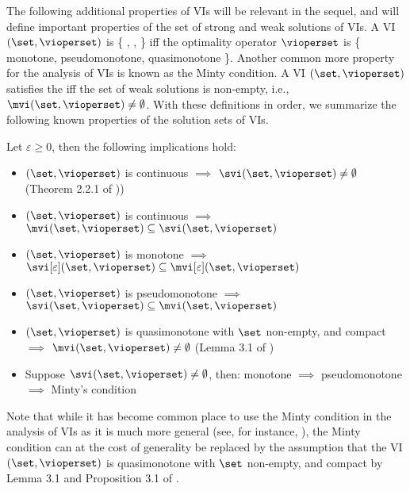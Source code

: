 The following additional properties of VIs will be relevant in the sequel, and will define important properties of the set of strong and weak solutions of VIs. 
A VI $(\set, \vioperset)$ is \{ , ,  \} iff the optimality operator $\vioperset$ is \{ monotone, pseudomonotone, quasimonotone \}.
% 
Another common more property for the analysis of VIs is known as the Minty condition. A VI $(\set, \vioperset)$ satisfies the  iff the set of weak solutions is non-empty, i.e., $\mvi(\set, \vioperset) \neq \emptyset$.
% 
With these definitions in order, we summarize the following known properties of the solution sets of VIs.

\begin{remark}
Let $\varepsilon \geq 0$, then the following implications hold:

    \begin{itemize}
        \item $(\set, \vioperset)$ is continuous $\implies$ $\svi(\set, \vioperset) \neq \emptyset$ (Theorem 2.2.1 of \citet{facchinei2003finite}))
        \item $(\set, \vioperset)$ is continuous $\implies$ $\mvi(\set, \vioperset) \subseteq \svi(\set, \vioperset)$ 
        \item $(\set, \vioperset)$ is monotone $\implies$ $\svi[\varepsilon](\set, \vioperset) \subseteq \mvi[\varepsilon](\set, \vioperset)$
        \item $(\set, \vioperset)$ is pseudomonotone $\implies$ $\svi(\set, \vioperset) \subseteq \mvi(\set, \vioperset)$
        \item $(\set, \vioperset)$ is quasimonotone with $\set$ non-empty, and compact $\implies$ $\mvi(\set, \vioperset) \neq \emptyset$ (Lemma 3.1 of \cite{he2017solvability})
        \item Suppose $\svi(\set, \vioperset) \neq \emptyset$, then: monotone $\implies$ pseudomonotone $\implies$ Minty's condition
    \end{itemize}
    
\end{remark}

Note that while it has become common place to use the Minty condition in the analysis of VIs as it is much more general (see, for instance, \citet{he2022convergence}), the Minty condition can at the cost of generality be replaced by the assumption that the VI $(\set, \vioperset)$ is quasimonotone with $\set$ non-empty, and compact by Lemma 3.1 and Proposition 3.1 of \cite{he2017solvability}.
\fi